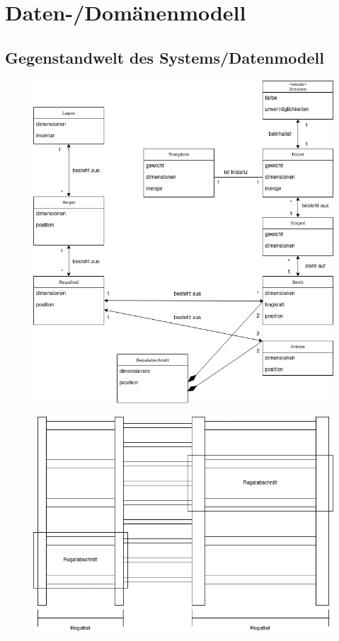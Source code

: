 \section{Daten-/Domänenmodell}
\subsection{Gegenstandwelt des Systems/Datenmodell}
\begin{figure}[h!]
    \includegraphics[width=\linewidth]{images/Domaenendiagramm.png}
    \label{fig:Domaenendiagramm}
\end{figure}
\begin{figure}[H]
    \includegraphics[width=\linewidth]{images/Regalmodell.png}
    \label{fig:Regalmodell}
\end{figure}
